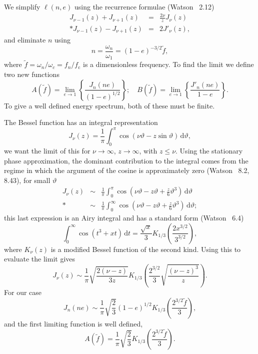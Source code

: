 \documentclass[aps,prd,amsfonts,amssymb,amsmath,nofootinbib,floatfix,reprint,showpacs,groupedaddress]{revtex4-1}
\newcommand{\sub}[1]{\ensuremath{_\text{#1}}}
\newcommand{\dd}{\ensuremath{\mathrm{d}}}
\newcommand{\intd}[4]{\ensuremath{\int_{#1}^{#2}{#3}\,\dd{#4}}}
\newcommand{\recip}[1]{\ensuremath{\frac{1}{#1}}}
\begin{document}
We simplify $\ell(n,e)$ using the recurrence formulae (Watson~\cite{Watson1995} 2.12)
\begin{eqnarray}
J_{\nu-1}(z) + J_{\nu+1}(z) & = & \frac{2\nu}{z}J_\nu(z)\\*
J_{\nu-1}(z) - J_{\nu+1}(z) & = & 2J'_\nu(z),\label{eq:J_derivative}
\end{eqnarray}
and eliminate $n$ using
\begin{equation}
n = \frac{\omega_n}{\omega_1} = (1-e)^{-3/2}\tilde{f},
\end{equation}
where $\tilde{f} = \omega_n/\omega_{c} = f_n/f\sub{c}$ is a dimensionless frequency. To find the limit we define two new functions
\begin{equation}
A(\tilde{f}) = \lim_{e\rightarrow 1}\left\{\frac{J_n(ne)}{(1-e)^{1/2}}\right\}; \quad B(\tilde{f}) = \lim_{e\rightarrow 1}\left\{\frac{J'_n(ne)}{1-e}\right\}.
\end{equation}
To give a well defined energy spectrum, both of these must be finite.

The Bessel function has an integral representation
\begin{equation}
J_\nu(z) = \recip{\pi}\intd{0}{\pi}{\cos(\nu\vartheta - z\sin\vartheta)}{\vartheta},
\end{equation}
we want the limit of this for $\nu \rightarrow \infty$, $z \rightarrow \infty$, with $z \leq \nu$. Using the stationary phase approximation, the dominant contribution to the integral comes from the regime in which the argument of the cosine is approximately zero (Watson~\cite{Watson1995} 8.2, 8.43), for small $\vartheta$
\begin{eqnarray}
J_\nu(z) & \sim & \recip{\pi}\intd{0}{\pi}{\cos\left(\nu\vartheta - z\vartheta + \frac{z}{6}\vartheta^3\right)}{\vartheta}\\*
 & \sim & \recip{\pi}\intd{0}{\infty}{\cos\left(\nu\vartheta - z\vartheta + \frac{z}{6}\vartheta^3\right)}{\vartheta};
\end{eqnarray}
this last expression is an Airy integral and has a standard form (Watson~\cite{Watson1995} 6.4)
\begin{equation}
\intd{0}{\infty}{\cos(t^3 + xt)}{t} = \frac{\sqrt{x}}{3}K_{1/3}\left(\frac{2x^{3/2}}{3^{3/2}}\right),
\end{equation}
where $K_\nu(z)$ is a modified Bessel function of the second kind. Using this to evaluate the limit gives
\begin{equation}
J_\nu(z) \sim \recip{\pi}\sqrt{\frac{2(\nu - z)}{3z}}K_{1/3}\left(\frac{2^{3/2}}{3}\sqrt{\frac{(\nu -z)^3}{z}}\right).
\label{eq:J_nu}
\end{equation}
For our case
\begin{equation}
J_n(ne) \sim \recip{\pi}\sqrt{\frac{2}{3}}(1-e)^{1/2}K_{1/3}\left(\frac{2^{3/2}\tilde{f}}{3}\right),
\end{equation}
and the first limiting function is well defined,
\begin{equation}
A(\tilde{f}) = \recip{\pi}\sqrt{\frac{2}{3}}K_{1/3}\left(\frac{2^{3/2}\tilde{f}}{3}\right).
\end{equation}
\end{document}
